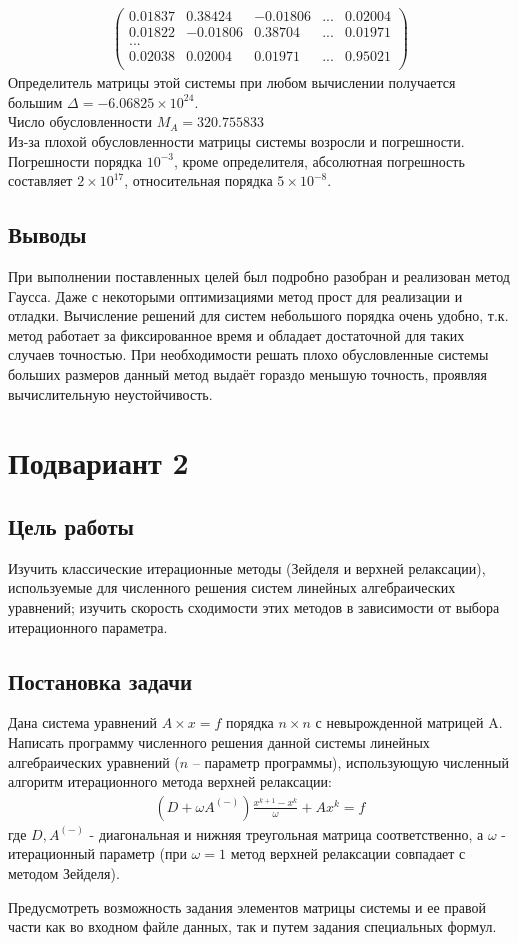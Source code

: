 \documentclass[a4paper,12pt,titlepage,finall]{article}
\begin{document}
\begin{enumerate}
\begin{align*}
\begin{pmatrix}
	0.01837&     0.38424&    -0.01806& ... &     0.02004 \\
	0.01822&    -0.01806&     0.38704& ... &     0.01971 \\
	...\\
	0.02038&     0.02004&     0.01971& ... &     0.95021 \\
\end{pmatrix}
\end{align*}
Определитель матрицы этой системы при любом вычислении получается большим $\Delta = -6.06825 \times 10^24$.\\
Число обусловленности $M_A = 320.755833$\\
Из-за плохой обусловленности матрицы системы возросли и погрешности. Погрешности порядка $10^{-3}$, кроме определителя, абсолютная погрешность составляет $2 \times 10^{17}$, относительная порядка $5 \times 10^{-8}$.
\end{enumerate}
\subsection{Выводы}
При выполнении поставленных целей был подробно разобран и реализован метод Гаусса. Даже с некоторыми оптимизациями метод прост для реализации и отладки. Вычисление решений для систем небольшого порядка очень удобно, т.к. метод работает за фиксированное время и обладает достаточной для таких случаев точностью. При необходимости решать плохо обусловленные системы больших размеров данный метод выдаёт гораздо меньшую точность, проявляя вычислительную неустойчивость.

\newpage
\section{Подвариант 2}
\subsection{Цель работы}
Изучить классические итерационные методы (Зейделя и верхней релаксации),
используемые для численного решения систем линейных алгебраических уравнений;
изучить скорость сходимости этих методов в зависимости от выбора итерационного
параметра.
\subsection{Постановка задачи}
Дана система уравнений $A \times x=f$ порядка $n \times n$ с невырожденной матрицей A. Написать
программу численного решения данной системы линейных алгебраических уравнений
($n$ – параметр программы), использующую численный алгоритм итерационного метода
верхней релаксации:
\begin{align*}
(D + \omega A^{(-)})\frac{x^{k+1}-x^k}{\omega} + Ax^k = f
\end{align*}
где $D, A^{(-)}$ - диагональная и нижняя треугольная матрица соответственно, а $\omega$ - итерационный параметр (при $\omega = 1$ метод верхней релаксации совпадает с методом Зейделя).
\par
Предусмотреть возможность задания элементов матрицы системы и ее правой части как
во входном файле данных, так и путем задания специальных формул.
\end{document}
